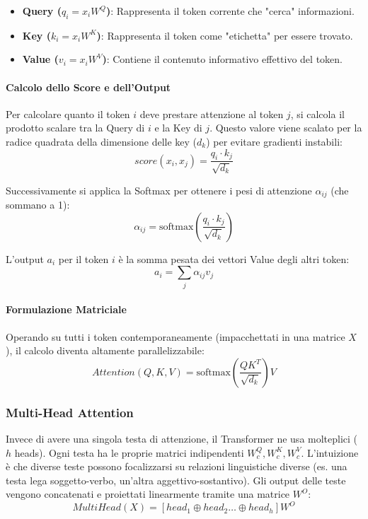             \begin{itemize}
                \item \textbf{Query ($q_i = x_i W^Q$)}: Rappresenta il token corrente che "cerca" informazioni.
                \item \textbf{Key ($k_i = x_i W^K$)}: Rappresenta il token come "etichetta" per essere trovato.
                \item \textbf{Value ($v_i = x_i W^V$)}: Contiene il contenuto informativo effettivo del token.
            \end{itemize}
            
            \paragraph{Calcolo dello Score e dell'Output}
            Per calcolare quanto il token $i$ deve prestare attenzione al token $j$, si calcola il prodotto scalare tra la Query di $i$ e la Key di $j$. Questo valore viene scalato per la radice quadrata della dimensione delle key ($d_k$) per evitare gradienti instabili:
            \[ score(x_i, x_j) = \frac{q_i \cdot k_j}{\sqrt{d_k}} \]
            
            Successivamente si applica la Softmax per ottenere i pesi di attenzione $\alpha_{ij}$ (che sommano a 1):
            \[ \alpha_{ij} = \text{softmax}\left( \frac{q_i \cdot k_j}{\sqrt{d_k}} \right) \]
            
            L'output $a_i$ per il token $i$ è la somma pesata dei vettori Value degli altri token:
            \[ a_i = \sum_{j} \alpha_{ij} v_j \]
            
            \paragraph{Formulazione Matriciale}
            Operando su tutti i token contemporaneamente (impacchettati in una matrice $X$), il calcolo diventa altamente parallelizzabile:
            \[ Attention(Q, K, V) = \text{softmax}\left( \frac{QK^T}{\sqrt{d_k}} \right) V \]
        
        \subsubsection{Multi-Head Attention}
            
        Invece di avere una singola testa di attenzione, il Transformer ne usa molteplici ($h$ heads). Ogni testa ha le proprie matrici indipendenti $W^Q_c, W^K_c, W^V_c$.
            L'intuizione è che diverse teste possono focalizzarsi su relazioni linguistiche diverse (es. una testa lega soggetto-verbo, un'altra aggettivo-sostantivo).
            Gli output delle teste vengono concatenati e proiettati linearmente tramite una matrice $W^O$:
            \[ MultiHead(X) = [head_1 \oplus head_2 \dots \oplus head_h] W^O \]
        
